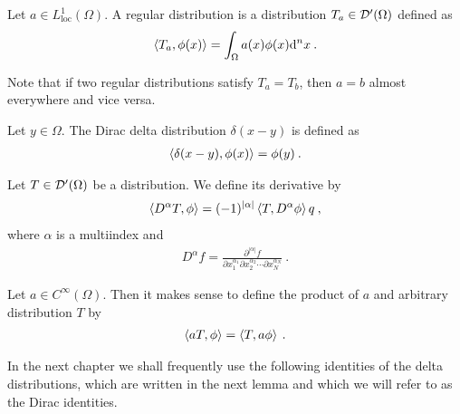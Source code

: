 \begin{definition}
    Let $a \in L^1_{\text{loc}}(\Omega)$. A regular distribution is a distribution $T_a \in \mathcal{D'}(\Omega)$ defined as
    \begin{align}
        \left \langle T_a ,\phi(x) \right \rangle = \int_\Omega a(x) \phi(x) \mathrm{d}^n x \:.
    \end{align}
\end{definition}

Note that if two regular distributions satisfy $T_a = T_b$, then $a=b$ almost everywhere and vice versa.

\begin{definition}
    Let $y \in \Omega$. The Dirac delta distribution $\delta(x-y)$ is defined as
    \begin{align}
        \left \langle \delta(x-y) ,\phi(x) \right \rangle = \phi(y) \:. 
    \end{align}
\end{definition}



\begin{definition}
    Let $T \in \mathcal{D'}(\Omega)$ be a distribution. We define its derivative by
    \begin{align}
        \left \langle D^\alpha T ,\phi \right \rangle = (-1)^{|\alpha|} \left \langle T ,D^\alpha \phi \right \rangle q \:,
    \end{align}
    where $\alpha$ is a multiindex and
    \begin{align}
        D^\alpha f = \frac{\partial^{|\alpha|} f}{\partial x_1^{\alpha_1} \partial x_2^{\alpha_2} \cdots \partial x^{\alpha_N}_N} \:.
    \end{align}
\end{definition}



Let $a \in C^\infty(\Omega)$. Then it makes sense to define the product of $a$ and arbitrary distribution $T$ by
\begin{align}
    \left \langle a T ,\phi \right \rangle = \left \langle T ,a \phi \right \rangle \:.
\end{align}

In the next chapter we shall frequently use the following identities of the delta distributions, which are written in the next lemma and which we will refer to as the Dirac identities.

